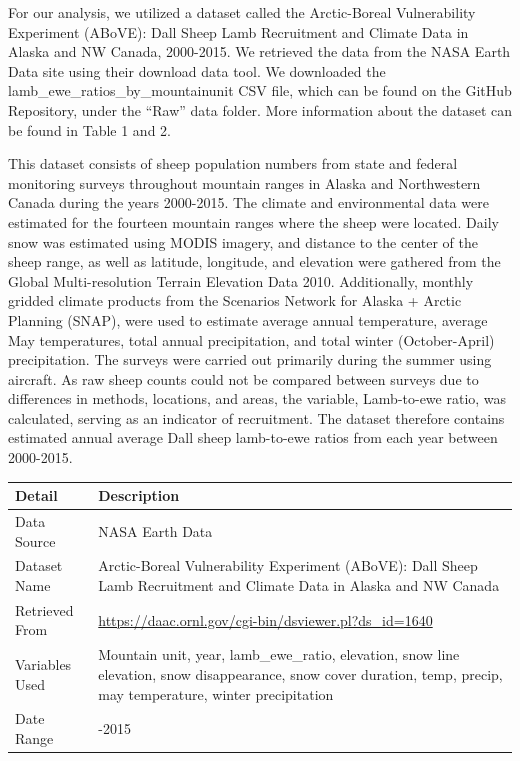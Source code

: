 \documentclass[
  12pt,
]{article}
\begin{document}
For our analysis, we utilized a dataset called the Arctic-Boreal
Vulnerability Experiment (ABoVE): Dall Sheep Lamb Recruitment and
Climate Data in Alaska and NW Canada, 2000-2015. We retrieved the data
from the NASA Earth Data site using their download data tool. We
downloaded the lamb\_ewe\_ratios\_by\_mountainunit CSV file, which can
be found on the GitHub Repository, under the ``Raw'' data folder. More
information about the dataset can be found in Table 1 and 2.

This dataset consists of sheep population numbers from state and federal
monitoring surveys throughout mountain ranges in Alaska and Northwestern
Canada during the years 2000-2015. The climate and environmental data
were estimated for the fourteen mountain ranges where the sheep were
located. Daily snow was estimated using MODIS imagery, and distance to
the center of the sheep range, as well as latitude, longitude, and
elevation were gathered from the Global Multi-resolution Terrain
Elevation Data 2010. Additionally, monthly gridded climate products from
the Scenarios Network for Alaska + Arctic Planning (SNAP), were used to
estimate average annual temperature, average May temperatures, total
annual precipitation, and total winter (October-April) precipitation.
The surveys were carried out primarily during the summer using aircraft.
As raw sheep counts could not be compared between surveys due to
differences in methods, locations, and areas, the variable, Lamb-to-ewe
ratio, was calculated, serving as an indicator of recruitment. The
dataset therefore contains estimated annual average Dall sheep
lamb-to-ewe ratios from each year between 2000-2015.

\begin{longtable}[]{@{}
  >{\raggedright\arraybackslash}p{}
  >{\raggedright\arraybackslash}p{}@{}}
\toprule
Detail & Description \\
\midrule
\endhead
Data Source & NASA Earth Data \\
Dataset Name & Arctic-Boreal Vulnerability Experiment (ABoVE): Dall
Sheep Lamb Recruitment and Climate Data in Alaska and NW Canada \\
Retrieved From &
\url{https://daac.ornl.gov/cgi-bin/dsviewer.pl?ds_id=1640} \\
Variables Used & Mountain unit, year, lamb\_ewe\_ratio, elevation, snow
line elevation, snow disappearance, snow cover duration, temp, precip,
may temperature, winter precipitation \\
Date Range & 2000-2015 \\
\bottomrule
\end{longtable}
\end{document}
